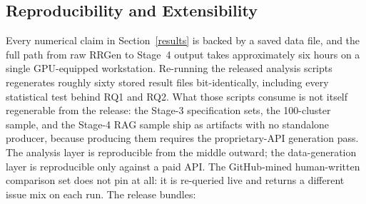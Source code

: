 \documentclass[sigconf, anonymous]{acmart}
\begin{document}
\subsection{Reproducibility and Extensibility}\label{reproducibility}
Every numerical claim in Section~\ref{results} is backed by a saved data file, and the full path from raw RRGen to Stage~4 output takes approximately six hours on a single GPU-equipped workstation. Re-running the released analysis scripts regenerates roughly sixty stored result files bit-identically, including every statistical test behind RQ1 and RQ2. What those scripts consume is not itself regenerable from the release: the Stage-3 specification sets, the 100-cluster sample, and the Stage-4 RAG sample ship as artifacts with no standalone producer, because producing them requires the proprietary-API generation pass. The analysis layer is reproducible from the middle outward; the data-generation layer is reproducible only against a paid API. The GitHub-mined human-written comparison set does not pin at all: it is re-queried live and returns a different issue mix on each run. The release bundles:
\end{document}
